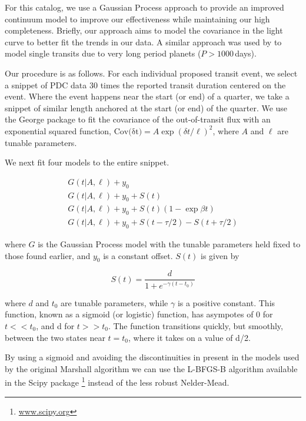 For this catalog, we use a Gaussian Process approach \citep[GP][]{Rasmussen10} to provide an improved continuum model to improve our effectiveness while maintaining our high completeness. Briefly, our approach aims to model the covariance in the light curve to better fit the trends in our data.
A similar approach was used by \citet{ForemanMackey16} to model single transits due to very long period planets ($P > 1000$\,days).

Our procedure is as follows. For each individual proposed transit event, we select a snippet of PDC data 30 times the reported transit duration centered on the event. Where the event happens near the start (or end) of a quarter, we take a snippet of similar length anchored at the start (or end) of the quarter. We use the George package \citep{Ambikasaran14} to fit the covariance of the out-of-transit flux with an exponential squared function, $ {\mathrm{Cov(\delta t})} = A \exp{ (\delta t/\ell)^2}$, where $A$ and $\ell$ are tunable parameters. 

We next fit four models to the entire snippet.

\begin{equation}
\left.\begin{aligned}
G(t | A, \ell) + y_0 \\
G(t | A, \ell) + y_0 + S(t)\\
G(t | A, \ell) + y_0 + S(t)(1 - \exp{\beta t})\\
G(t | A, \ell) + y_0 + S(t - \tau/2) - S(t + \tau/2) 
\end{aligned}\right.
\end{equation}

\noindent
where $G$ is the Gaussian Process model with the tunable parameters held fixed to those found earlier, and $y_0$ is a constant offset. $S(t)$ is given by

\begin{equation}
S(t) = \frac{d}{1 + e^{-\gamma (t-t_0)} }
\end{equation}

\noindent
where $d$ and $t_0$ are tunable parameters, while $\gamma$ is a positive constant. This function, known as a sigmoid (or logistic) function, has asympotes of 0 for $t<<t_0$, and d for $t>>t_0$. The function transitions quickly, but smoothly, between the two states near $t=t_0$, where it takes on a value of d/2. 

By using a sigmoid and avoiding the discontinuities in present in the models used by the original Marshall algorithm \citep{Mullally2016} we can use the L-BFGS-B algorithm \citep{Byrd95} available in the Scipy package \footnote{\url{www.scipy.org}} instead of the less robust Nelder-Mead.


